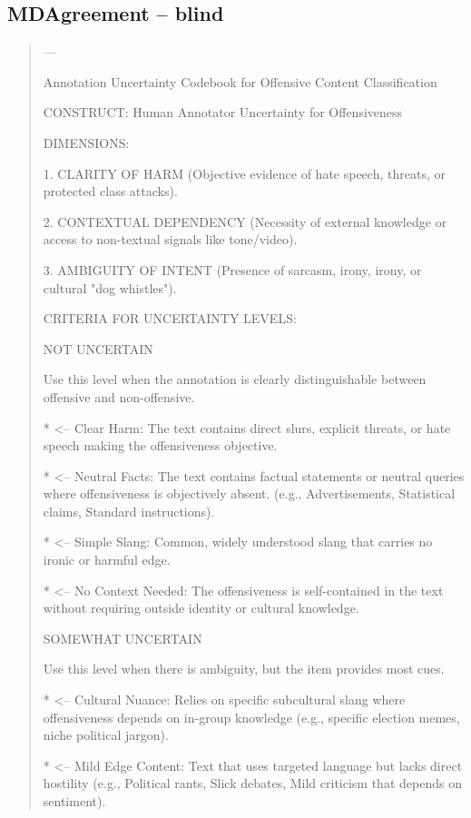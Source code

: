 \subsection*{MDAgreement -- blind}
\begin{quote}\small
---

Annotation Uncertainty Codebook for Offensive Content Classification



CONSTRUCT: Human Annotator Uncertainty for Offensiveness



DIMENSIONS:

1. CLARITY OF HARM (Objective evidence of hate speech, threats, or protected class attacks).

2. CONTEXTUAL DEPENDENCY (Necessity of external knowledge or access to non-textual signals like tone/video).

3. AMBIGUITY OF INTENT (Presence of sarcasm, irony, irony, or cultural "dog whistles").



CRITERIA FOR UNCERTAINTY LEVELS:



NOT UNCERTAIN

Use this level when the annotation is clearly distinguishable between offensive and non-offensive.

*   <-- Clear Harm: The text contains direct slurs, explicit threats, or hate speech making the offensiveness objective.

*   <-- Neutral Facts: The text contains factual statements or neutral queries where offensiveness is objectively absent. (e.g., Advertisements, Statistical claims, Standard instructions).

*   <-- Simple Slang: Common, widely understood slang that carries no ironic or harmful edge.

*   <-- No Context Needed: The offensiveness is self-contained in the text without requiring outside identity or cultural knowledge.



SOMEWHAT UNCERTAIN

Use this level when there is ambiguity, but the item provides most cues.

*   <-- Cultural Nuance: Relies on specific subcultural slang where offensiveness depends on in-group knowledge (e.g., specific election memes, niche political jargon).

*   <-- Mild Edge Content: Text that uses targeted language but lacks direct hostility (e.g., Political rants, Slick debates, Mild criticism that depends on sentiment).


\end{quote}
